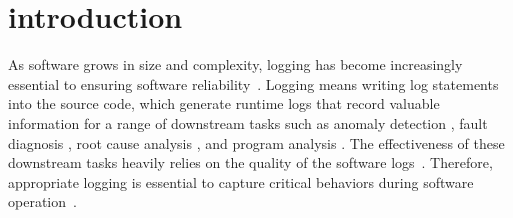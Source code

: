 
\section{introduction}
\label{sec:intro}
As software grows in size and complexity, logging has become increasingly essential to ensuring software reliability~\cite{he2021survey, Chen2021ASO}. 
Logging means writing log statements into the source code, which generate runtime logs that record valuable information for a range of downstream tasks such as anomaly detection \cite{Zhang2019RobustLA, Lou2010MiningIF, He2016ExperienceRS, Du2017DeepLogAD, Zhang2019RobustLA}, fault diagnosis \cite{Zou2016UiLogIL,xu2023hue, xu2024divlog}, root cause analysis \cite{Amar2019MiningHT, He2018IdentifyingIS, Lin2016LogCB,xu2025openrca}, and program analysis \cite{Ding2015Log2AC, Shang2013AssistingDO, xu2024aligning}. 
The effectiveness of these downstream tasks heavily relies on the quality of the software logs~\cite{He2018CharacterizingTN}. Therefore, appropriate logging is essential to capture critical behaviors during software operation~\cite{YuanUsenixA1}.


